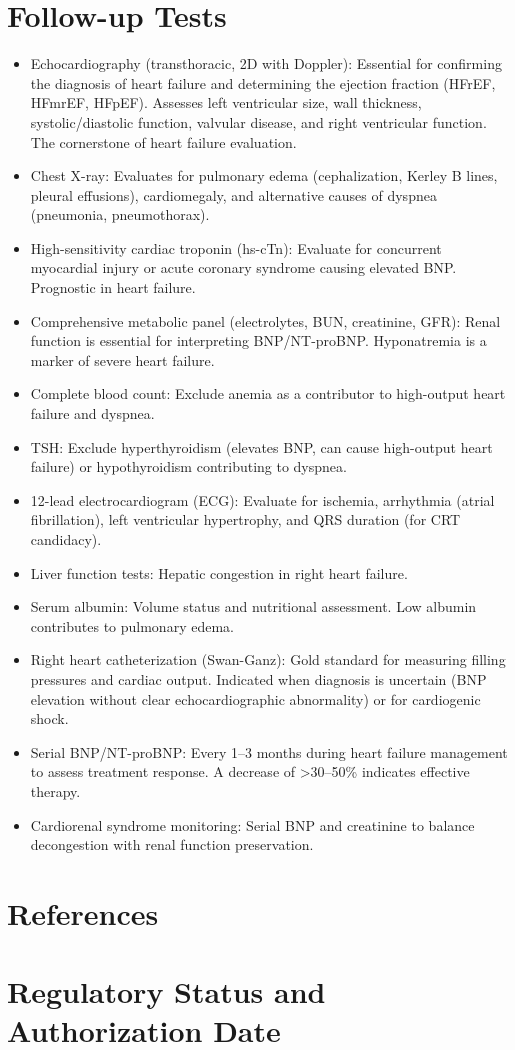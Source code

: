 \section*{Follow-up Tests}
\begin{itemize}
  \item Echocardiography (transthoracic, 2D with Doppler): Essential for confirming the diagnosis of heart failure and determining the ejection fraction (HFrEF, HFmrEF, HFpEF). Assesses left ventricular size, wall thickness, systolic/diastolic function, valvular disease, and right ventricular function. The cornerstone of heart failure evaluation.
  \item Chest X-ray: Evaluates for pulmonary edema (cephalization, Kerley B lines, pleural effusions), cardiomegaly, and alternative causes of dyspnea (pneumonia, pneumothorax).
  \item High-sensitivity cardiac troponin (hs-cTn): Evaluate for concurrent myocardial injury or acute coronary syndrome causing elevated BNP. Prognostic in heart failure.
  \item Comprehensive metabolic panel (electrolytes, BUN, creatinine, GFR): Renal function is essential for interpreting BNP/NT-proBNP. Hyponatremia is a marker of severe heart failure.
  \item Complete blood count: Exclude anemia as a contributor to high-output heart failure and dyspnea.
  \item TSH: Exclude hyperthyroidism (elevates BNP, can cause high-output heart failure) or hypothyroidism contributing to dyspnea.
  \item 12-lead electrocardiogram (ECG): Evaluate for ischemia, arrhythmia (atrial fibrillation), left ventricular hypertrophy, and QRS duration (for CRT candidacy).
  \item Liver function tests: Hepatic congestion in right heart failure.
  \item Serum albumin: Volume status and nutritional assessment. Low albumin contributes to pulmonary edema.
  \item Right heart catheterization (Swan-Ganz): Gold standard for measuring filling pressures and cardiac output. Indicated when diagnosis is uncertain (BNP elevation without clear echocardiographic abnormality) or for cardiogenic shock.
  \item Serial BNP/NT-proBNP: Every 1--3 months during heart failure management to assess treatment response. A decrease of >30--50\% indicates effective therapy.
  \item Cardiorenal syndrome monitoring: Serial BNP and creatinine to balance decongestion with renal function preservation.
\end{itemize}

\section*{References}



\clearpage
\section*{Regulatory Status and Authorization Date}

\clearpage
